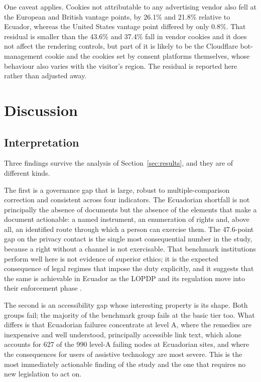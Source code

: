 \documentclass[]{interact}
\begin{document}
One caveat applies. Cookies not attributable to any advertising vendor also fell at the European and British vantage points, by 26.1\% and 21.8\% relative to Ecuador, whereas the United States vantage point differed by only 0.8\%. That residual is smaller than the 43.6\% and 37.4\% fall in vendor cookies and it does not affect the rendering controls, but part of it is likely to be the Cloudflare bot-management cookie and the cookies set by consent platforms themselves, whose behaviour also varies with the visitor's region. The residual is reported here rather than adjusted away.

\section{Discussion}\label{sec:discussion}

\subsection{Interpretation}\label{sec:discussion-interp}

Three findings survive the analysis of Section~\ref{sec:results}, and they are of different kinds.

The first is a governance gap that is large, robust to multiple-comparison correction and consistent across four indicators. The Ecuadorian shortfall is not principally the absence of documents but the absence of the elements that make a document actionable: a named instrument, an enumeration of rights and, above all, an identified route through which a person can exercise them. The 47.6-point gap on the privacy contact is the single most consequential number in the study, because a right without a channel is not exercisable. That benchmark institutions perform well here is not evidence of superior ethics; it is the expected consequence of legal regimes that impose the duty explicitly, and it suggests that the same is achievable in Ecuador as the LOPDP and its regulation move into their enforcement phase \citep{lopdp2021,reglamentolopdp2023}.

The second is an accessibility gap whose interesting property is its shape. Both groups fail; the majority of the benchmark group fails at the basic tier too. What differs is that Ecuadorian failures concentrate at level A, where the remedies are inexpensive and well understood, principally accessible link text, which alone accounts for 627 of the 990 level-A failing nodes at Ecuadorian sites, and where the consequences for users of assistive technology are most severe. This is the most immediately actionable finding of the study and the one that requires no new legislation to act on.
\end{document}
